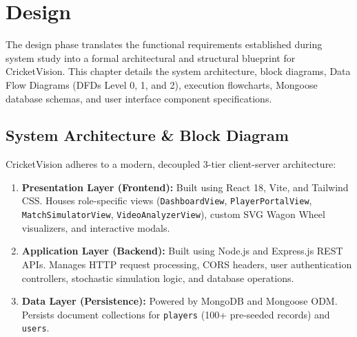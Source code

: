 \documentclass[12pt,a4paper]{report}
\begin{document}
\clearpage

\chapter{Design}

The design phase translates the functional requirements established during system study into a formal architectural and structural blueprint for CricketVision. This chapter details the system architecture, block diagrams, Data Flow Diagrams (DFDs Level 0, 1, and 2), execution flowcharts, Mongoose database schemas, and user interface component specifications.

\section{System Architecture \& Block Diagram}
CricketVision adheres to a modern, decoupled 3-tier client-server architecture:

\begin{enumerate}
    \item \textbf{Presentation Layer (Frontend):} Built using React 18, Vite, and Tailwind CSS. Houses role-specific views (\texttt{DashboardView}, \texttt{PlayerPortalView}, \texttt{MatchSimulatorView}, \texttt{VideoAnalyzerView}), custom SVG Wagon Wheel visualizers, and interactive modals.
    \item \textbf{Application Layer (Backend):} Built using Node.js and Express.js REST APIs. Manages HTTP request processing, CORS headers, user authentication controllers, stochastic simulation logic, and database operations.
    \item \textbf{Data Layer (Persistence):} Powered by MongoDB and Mongoose ODM. Persists document collections for \texttt{players} (100+ pre-seeded records) and \texttt{users}.
\end{enumerate}
\end{document}
